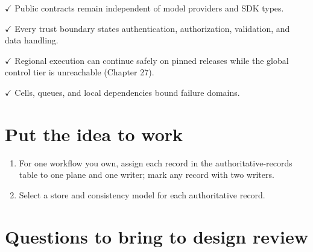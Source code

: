 \textbf{\ensuremath{\checkmark}} Public contracts remain independent of model providers and SDK types.\par

\textbf{\ensuremath{\checkmark}} Every trust boundary states authentication, authorization, validation, and data handling.\par

\textbf{\ensuremath{\checkmark}} Regional execution can continue safely on pinned releases while the global control tier is unreachable (Chapter 27).\par

\textbf{\ensuremath{\checkmark}} Cells, queues, and local dependencies bound failure domains.\par

\section{Put the idea to work}

\begin{enumerate}

\item For one workflow you own, assign each record in the authoritative-records table to one plane and one writer; mark any record with two writers.

\item Select a store and consistency model for each authoritative record.

\end{enumerate}

\section{Questions to bring to design review}

